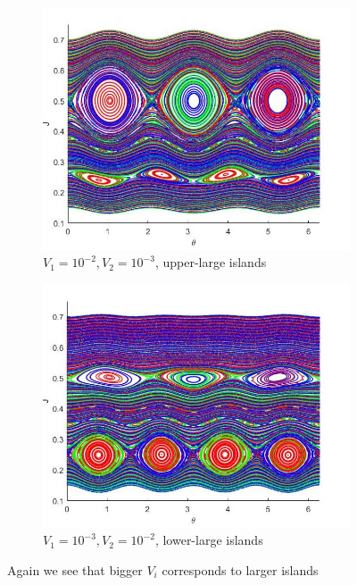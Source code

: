 \begin{figure}[H]
	\centering
	\begin{subfigure}{.5\textwidth}
  		\centering
  		\includegraphics[scale=0.5,left]{Hamiltonian_1/numerical/figs/Q5_1e-2.1e-3_3634}
  		\caption{$V_1=10^{-2},V_2=10^{-3}$, upper-large islands}
  		\label{fig2.6a}
	\end{subfigure}%
	\begin{subfigure}{.5\textwidth}
  		\includegraphics[scale=0.5,right]{Hamiltonian_1/numerical/figs/Q5_1e-3.1e-2_3634}
  		\caption{$V_1=10^{-3},V_2=10^{-2}$, lower-large islands}
  		\label{fig2.6b}
	\end{subfigure}
	\caption{ Again we see that bigger $V_i$ corresponds to larger islands}
	\label{fig2.6}
\end{figure}

